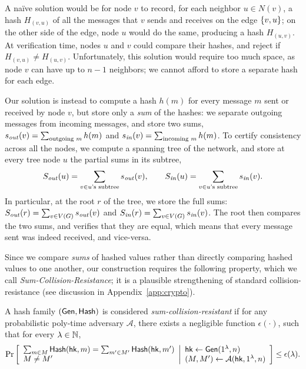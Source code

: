A na\"ive solution would be for node $v$ to record, for each neighbor $u \in N(v)$,
a hash $H_{(v,u)}$ of all the messages that $v$ sends and receives on the edge $\left \{{v,u} \right \}$;
on the other side of the edge, node $u$ would do the same, producing a hash $H_{(u,v)}$.
At verification time, nodes $u$ and $v$ could compare their hashes, and reject if $H_{(v,u)} \neq H_{(u,v)}$.
Unfortunately, this solution would require too much space,
as node $v$ can have up to $n - 1$ neighbors;
we cannot afford to store a separate hash for each edge.

Our solution is instead to compute a hash $h(m)$
for every message $m$ sent or received by node $v$,
but store only a \emph{sum} of the hashes:
we separate outgoing messages from incoming messages,
and store two sums,
$s_{\mathit{ out }}(v) = \sum_{\text{outgoing $m$}} h(m)$
and
$s_{\mathit{ in }}(v) = \sum_{\text{incoming $m$}} h(m)$.
To certify consistency across all the nodes,
we compute a spanning tree of the network,
and store at every tree node $u$ the partial sums
in its subtree,
\begin{equation*}
	S_{\mathit{ out }}(u) = \sum_{v \in \text{$u$'s subtree}} s_{\mathit{ out }}(v),
	\qquad
	S_{\mathit{ in }}(u) = \sum_{v \in \text{$u$'s subtree}} s_{\mathit{ in }}(v).
\end{equation*}
In particular, at the root $r$ of the tree, we store the full sums:
	$S_{\mathit{ out }}(r) = \sum_{v \in V(G)} s_{\mathit{ out }}(v)$
	and
	$S_{\mathit{ in }}(r) = \sum_{v \in V(G)} s_{\mathit{ in }}(v)$.
The root then compares the two sums, and verifies that they are equal,
which means that every message sent was indeed received, and vice-versa.


Since we compare \emph{sums} of hashed values rather than
directly comparing hashed values to one another,
our construction requires the following property,
which we call \emph{Sum-Collision-Resistance};
it is a plausible strengthening of standard collision-resistance (see discussion in Appendix~\ref{app:crypto}).

\begin{definition} 
    A hash family $(\mathsf{Gen}, \mathsf{Hash})$ is considered \emph{sum-collision-resistant} if for any probabilistic poly-time adversary $\mathcal{A}$, there exists a negligible function $\epsilon(\cdot)$, such that for every $\lambda\in \mathbb{N}$,  
    \begin{gather*}
        \Pr \left[ \begin{array}{ll} 
		\sum_{ m \in M }\mathsf{Hash}(\mathsf{hk}, m) = \sum_{ m' \in M'}\mathsf{Hash}(\mathsf{hk}, m')\\
		M \neq M'
	 \end{array} \middle\vert \begin{array}{ll} 
		\mathsf{hk} \leftarrow \mathsf{Gen}(1^\lambda, n) \\
		(M, M') \leftarrow\mathcal{A}(\mathsf{hk}, 1^\lambda, n)
         \end{array} \right]
	\leq \epsilon(\lambda)
	.
    \end{gather*}
\end{definition}


